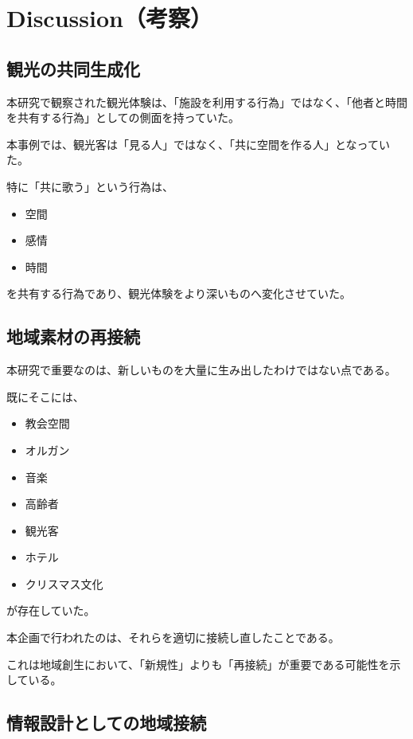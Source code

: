 \section{Discussion（考察）}

\subsection{観光の共同生成化}

本研究で観察された観光体験は、「施設を利用する行為」ではなく、「他者と時間を共有する行為」としての側面を持っていた。

本事例では、観光客は「見る人」ではなく、「共に空間を作る人」となっていた。

特に「共に歌う」という行為は、

\begin{itemize}
\item 空間
\item 感情
\item 時間
\end{itemize}

を共有する行為であり、観光体験をより深いものへ変化させていた。


\subsection{地域素材の再接続}

本研究で重要なのは、新しいものを大量に生み出したわけではない点である。

既にそこには、

\begin{itemize}
\item 教会空間
\item オルガン
\item 音楽
\item 高齢者
\item 観光客
\item ホテル
\item クリスマス文化
\end{itemize}

が存在していた。

本企画で行われたのは、それらを適切に接続し直したことである。

これは地域創生において、「新規性」よりも「再接続」が重要である可能性を示している。


\subsection{情報設計としての地域接続}


